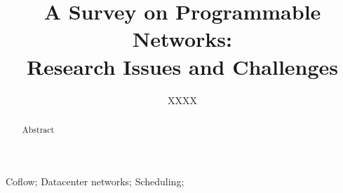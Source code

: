 


\title{A Survey on Programmable Networks:\\ Research Issues and Challenges}

\author{XXXX}

\maketitle

\begin{abstract}

Abstract
\end{abstract}

\begin{IEEEkeywords}
 Coflow; Datacenter networks; Scheduling;
\end{IEEEkeywords}

\IEEEpeerreviewmaketitle














 